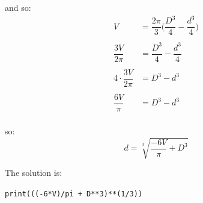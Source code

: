 \documentclass{article}
\begin{document}
  and so:
  \begin{align*}
    V &= \dfrac{2\pi{}}{3}\bigg(\dfrac{D^3}{4} - \dfrac{d^3}{4}\bigg)\\\\
    \dfrac{3V}{2\pi{}} &= \dfrac{D^3}{4} - \dfrac{d^3}{4}\\\\
    4\cdot \dfrac{3V}{2\pi{}} &= D^3 - d^3\\\\
    \dfrac{6V}{\pi{}} &= D^3 - d^3\\
  \end{align*}

  so:
  \[ d = \sqrt[3]{\dfrac{-6V}{\pi} + D^3} \]

  The solution is:
  \begin{center}
    \tt{print(((-6*V)/pi + D**3)**(1/3))}
  \end{center}
  
\end{document}
